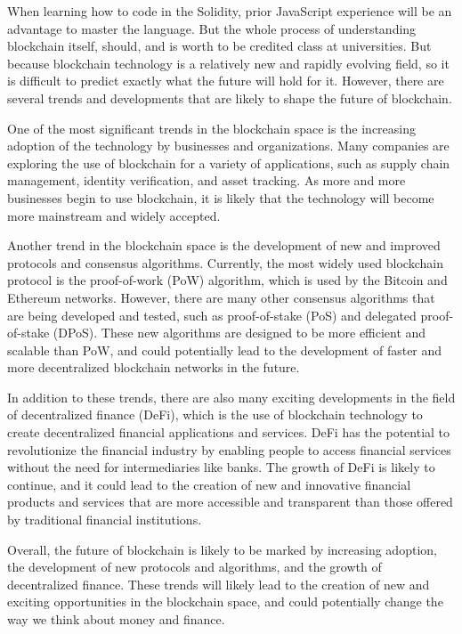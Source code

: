 \documentclass[10pt,twocolumn]{article}
\begin{document}
When learning how to code in the Solidity, prior JavaScript experience will be an advantage to master the language. But the whole process of understanding blockchain itself, should, and is worth to be credited class at universities. But because blockchain technology is a relatively new and rapidly evolving field, so it is difficult to predict exactly what the future will hold for it. However, there are several trends and developments that are likely to shape the future of blockchain.

One of the most significant trends in the blockchain space is the increasing adoption of the technology by businesses and organizations. Many companies are exploring the use of blockchain for a variety of applications, such as supply chain management, identity verification, and asset tracking. As more and more businesses begin to use blockchain, it is likely that the technology will become more mainstream and widely accepted.

Another trend in the blockchain space is the development of new and improved protocols and consensus algorithms. Currently, the most widely used blockchain protocol is the proof-of-work (PoW) algorithm, which is used by the Bitcoin and Ethereum networks. However, there are many other consensus algorithms that are being developed and tested, such as proof-of-stake (PoS) and delegated proof-of-stake (DPoS). These new algorithms are designed to be more efficient and scalable than PoW, and could potentially lead to the development of faster and more decentralized blockchain networks in the future.

In addition to these trends, there are also many exciting developments in the field of decentralized finance (DeFi), which is the use of blockchain technology to create decentralized financial applications and services. DeFi has the potential to revolutionize the financial industry by enabling people to access financial services without the need for intermediaries like banks. The growth of DeFi is likely to continue, and it could lead to the creation of new and innovative financial products and services that are more accessible and transparent than those offered by traditional financial institutions.

Overall, the future of blockchain is likely to be marked by increasing adoption, the development of new protocols and algorithms, and the growth of decentralized finance. These trends will likely lead to the creation of new and exciting opportunities in the blockchain space, and could potentially change the way we think about money and finance.
\end{document}
